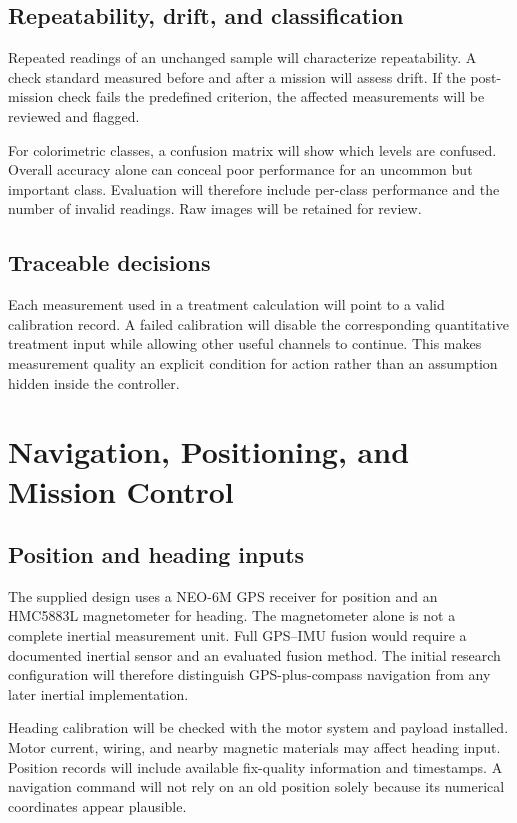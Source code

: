 \documentclass[12pt,a4paper]{article}
\newcommand{\papersection}[1]{\clearpage\section{#1}}
\begin{document}
\subsection{Repeatability, drift, and classification}
Repeated readings of an unchanged sample will characterize repeatability. A check standard measured before and after a mission will assess drift. If the post-mission check fails the predefined criterion, the affected measurements will be reviewed and flagged.

For colorimetric classes, a confusion matrix will show which levels are confused. Overall accuracy alone can conceal poor performance for an uncommon but important class. Evaluation will therefore include per-class performance and the number of invalid readings. Raw images will be retained for review.

\subsection{Traceable decisions}
Each measurement used in a treatment calculation will point to a valid calibration record. A failed calibration will disable the corresponding quantitative treatment input while allowing other useful channels to continue. This makes measurement quality an explicit condition for action rather than an assumption hidden inside the controller.

\papersection{Navigation, Positioning, and Mission Control}
\subsection{Position and heading inputs}
The supplied design uses a NEO-6M GPS receiver for position and an HMC5883L magnetometer for heading. The magnetometer alone is not a complete inertial measurement unit. Full GPS--IMU fusion would require a documented inertial sensor and an evaluated fusion method. The initial research configuration will therefore distinguish GPS-plus-compass navigation from any later inertial implementation.

Heading calibration will be checked with the motor system and payload installed. Motor current, wiring, and nearby magnetic materials may affect heading input. Position records will include available fix-quality information and timestamps. A navigation command will not rely on an old position solely because its numerical coordinates appear plausible.
\end{document}
